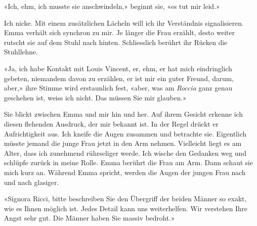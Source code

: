 «Ich, ehm, ich musste sie anschwindeln,» beginnt sie, «es tut mir leid.»

Ich nicke. Mit einem zusätzlichen Lächeln will ich ihr Verständnis
signalisieren. Emma verhält sich synchron zu mir.
Je länger die Frau erzählt, desto weiter rutscht sie auf dem Stuhl nach
hinten. Schliesslich berührt ihr Rücken die Stuhllehne.

«Ja, ich habe Kontakt mit Louis Vincent, er, ehm, er hat mich
eindringlich gebeten, niemandem davon zu erzählen, er ist mir ein guter
Freund, darum, aber,» ihre Stimme wird erstaunlich fest, «aber, was am
\emph{Roccia} ganz genau geschehen ist, weiss ich nicht. Das müssen Sie
mir glauben.»

Sie blickt zwischen Emma und mir hin und her. Auf ihrem Gesicht erkenne
ich diesen flehenden Ausdruck, der mir bekannt ist. In der Regel drückt
er Aufrichtigkeit aus. Ich kneife die Augen zusammen und betrachte sie.
Eigentlich müsste jemand die junge Frau jetzt in den Arm nehmen.
Vielleicht liegt es am Alter, dass ich zunehmend rührseliger werde. Ich
wische den Gedanken weg und schlüpfe zurück in meine Rolle.
Emma berührt die Frau am Arm. Dann schaut sie mich kurz an.
Während Emma spricht, werden die Augen der jungen Frau nach und nach
glasiger.

«Signora Ricci, bitte beschreiben Sie den Übergriff der beiden Männer so
exakt, wie es Ihnen möglich ist. Jedes Detail kann uns weiterhelfen. Wir
verstehen Ihre Angst sehr gut. Die Männer haben Sie massiv bedroht.»
